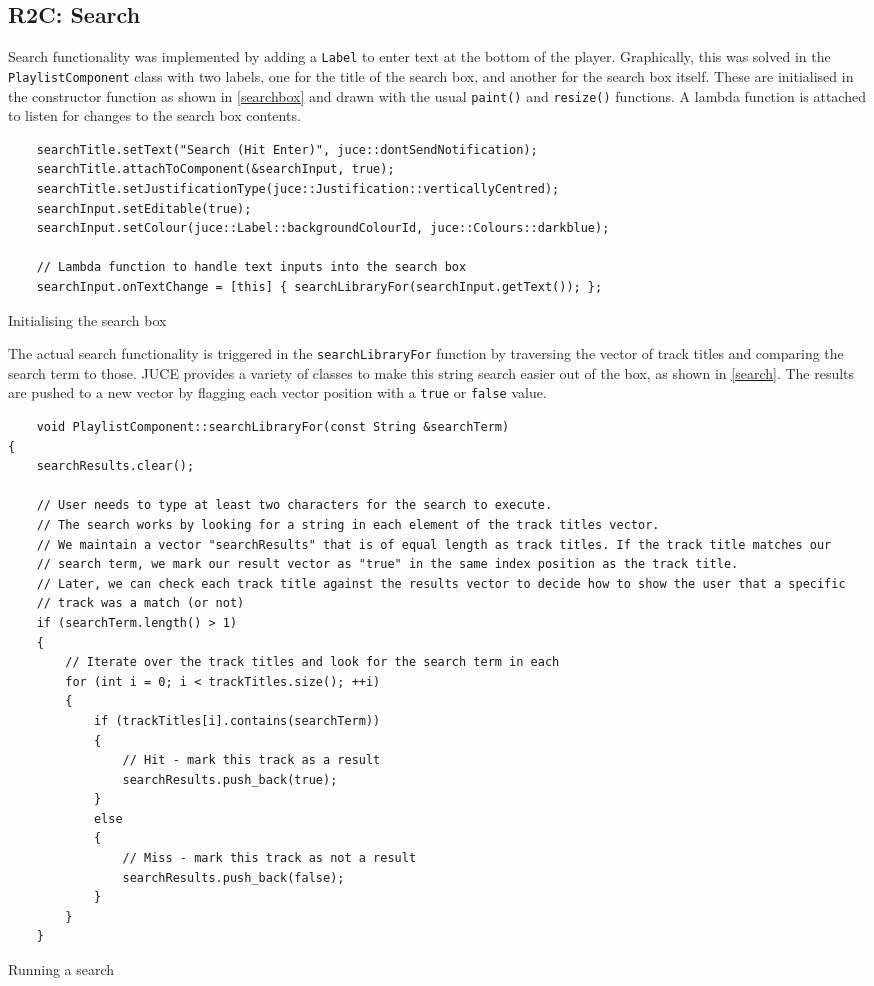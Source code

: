 \subsection{R2C: Search}
Search functionality was implemented by adding a \texttt{Label} to enter text at the bottom of the player. Graphically, this was solved in the \texttt{PlaylistComponent} class with two labels, one for the title of the search box, and another for the search box itself. These are initialised in the constructor function as shown in \autoref{searchbox} and drawn with the usual \texttt{paint()} and \texttt{resize()} functions. A lambda function is attached to listen for changes to the search box contents.

\begin{listing}
	\begin{verbatim}
	searchTitle.setText("Search (Hit Enter)", juce::dontSendNotification);
	searchTitle.attachToComponent(&searchInput, true);
	searchTitle.setJustificationType(juce::Justification::verticallyCentred);
	searchInput.setEditable(true);
	searchInput.setColour(juce::Label::backgroundColourId, juce::Colours::darkblue);

	// Lambda function to handle text inputs into the search box
	searchInput.onTextChange = [this] { searchLibraryFor(searchInput.getText()); };
	\end{verbatim}
	\caption{Initialising the search box}
	\label{searchbox}
\end{listing}

The actual search functionality is triggered in the \texttt{searchLibraryFor} function by traversing the vector of track titles and comparing the search term to those. JUCE provides a variety of classes to make this string search easier out of the box, as shown in \autoref{search}. The results are pushed to a new vector by flagging each vector position with a \texttt{true} or \texttt{false} value.

\begin{listing}
	\begin{verbatim}
	void PlaylistComponent::searchLibraryFor(const String &searchTerm)
{
	searchResults.clear();

	// User needs to type at least two characters for the search to execute.
	// The search works by looking for a string in each element of the track titles vector.
	// We maintain a vector "searchResults" that is of equal length as track titles. If the track title matches our
	// search term, we mark our result vector as "true" in the same index position as the track title.
	// Later, we can check each track title against the results vector to decide how to show the user that a specific
	// track was a match (or not)
	if (searchTerm.length() > 1)
	{
		// Iterate over the track titles and look for the search term in each
		for (int i = 0; i < trackTitles.size(); ++i)
		{
			if (trackTitles[i].contains(searchTerm))
			{
				// Hit - mark this track as a result
				searchResults.push_back(true);
			}
			else
			{
				// Miss - mark this track as not a result
				searchResults.push_back(false);
			}
		}
	}
	\end{verbatim}
	\caption{Running a search}
	\label{search}
\end{listing}

